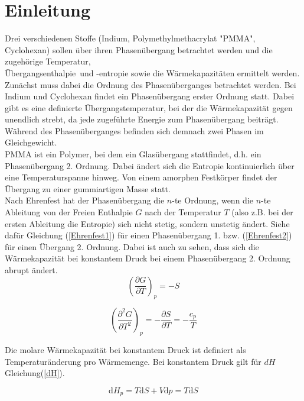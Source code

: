 \documentclass[12pt,a4paper,titlepage,headinclude,bibtotoc]{scrartcl}
\begin{document}
\section{Einleitung}
Drei verschiedenen Stoffe (Indium, Polymethylmethacrylat "PMMA", Cyclohexan) sollen über ihren Phasenübergang betrachtet werden und die zugehörige Temperatur,\\ Übergangsenthalpie\, und -entropie sowie die Wärmekapazitäten ermittelt werden.\\
Zunächst muss dabei die Ordnung des Phasenüberganges betrachtet werden. Bei Indium und Cyclohexan findet ein Phasenübergang erster Ordnung statt. Dabei gibt es eine definierte Übergangstemperatur, bei der die Wärmekapazität gegen unendlich strebt, da jede zugeführte Energie zum Phasenübergang beiträgt. Während des Phasenüberganges befinden sich demnach zwei Phasen im Gleichgewicht.\\
PMMA ist ein Polymer, bei dem ein Glasübergang stattfindet, d.h. ein Phasenübergang 2. Ordnung. Dabei ändert sich die Entropie kontinuierlich über eine Temperaturspanne hinweg. Von einem amorphen Festkörper findet der Übergang zu einer gummiartigen Masse statt.\\ 
Nach Ehrenfest hat der Phasenübergang die $n$-te Ordnung, wenn die $n$-te Ableitung von der Freien Enthalpie $G$ nach der Temperatur $T$ (also z.B. bei der ersten Ableitung die Entropie) sich nicht stetig, sondern unstetig ändert. Siehe dafür Gleichung (\ref{Ehrenfest1}) für einen Phasenübergang 1. bzw. (\ref{Ehrenfest2}) für einen Übergang 2. Ordnung. Dabei ist auch zu sehen, dass sich die Wärmekapazität bei konstantem Druck  bei einem Phasenübergang 2. Ordnung abrupt ändert.\\ 


\begin{equation} \label{Ehrenfest1}
\left(\frac{\partial G}{\partial T}\right)_p = -S
\end{equation}  
  
\begin{equation} \label{Ehrenfest2}
\left(\frac{\partial^2 G}{\partial T^2}\right)_p = -\frac{\partial S}{\partial T}= - \frac{c_p}{T}
\end{equation}  


Die molare Wärmekapazität bei konstantem Druck ist definiert als Temperaturänderung pro Wärmemenge. Bei konstantem Druck gilt für $dH$ Gleichung(\ref{dH}). 

\begin{equation} \label{dH}
\mathrm{d}H_p= T\mathrm{d}S +V\mathrm{d}p =T\mathrm{d}S
\end{equation}
\end{document}
